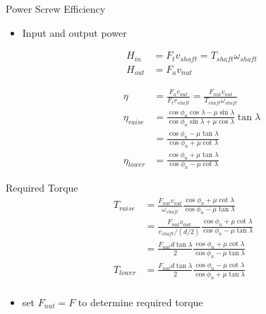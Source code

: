 \documentclass[10pt, svgnames]{beamer}
\begin{document}
\begin{frame}[label={sec:org0f19ab8}]{Power Screw Efficiency}
\begin{itemize}
\item Input and output power

\begin{align*}
  H_{in} &= F_{t} v_{shaft} = T_{shaft}\omega_{shaft} \\
  H_{out} &= F_{a} v_{nut}
\end{align*}

\begin{align*}
  \eta &= \frac{F_{a}v_{nut}}{F_{t}v_{shaft}} = \frac{F_{nut}v_{nut}}{T_{shaft}\omega_{shaft}} \\
  \eta_{raise} &= \frac{\cos \phi_{n} \cos \lambda - \mu \sin \lambda}{\cos \phi_{n} \sin \lambda + \mu \cos \lambda} \tan \lambda \\
       &= \frac{\cos \phi_{n} - \mu \tan \lambda}{\cos \phi_{n} + \mu \cot \lambda} \\
  \eta_{lower} &= \frac{\cos \phi_{n} + \mu \tan \lambda}{\cos \phi_{n} - \mu \cot \lambda}
\end{align*}
\end{itemize}
\end{frame}

\begin{frame}[label={sec:orgc786e65}]{Required Torque}
\begin{align*}
  T_{raise} &= \frac{F_{nut}v_{nut}}{\omega_{shaft}} \frac{\cos \phi_{n} + \mu \cot \lambda}{\cos \phi_{n} - \mu \tan \lambda} \\
            &= \frac{F_{nut}v_{nut}}{v_{shaft}/(d/2)} \frac{\cos \phi_{n} + \mu \cot \lambda}{\cos \phi_{n} - \mu \tan \lambda} \\
            &= \frac{F_{nut}d \tan \lambda}{2} \frac{\cos \phi_{n} + \mu \cot \lambda}{\cos \phi_{n} - \mu \tan \lambda} \\
  T_{lower} &= \frac{F_{nut}d \tan \lambda}{2} \frac{\cos \phi_{n} - \mu \cot \lambda}{\cos \phi_{n} + \mu \tan \lambda} \\
\end{align*}

\begin{itemize}
\item set \(F_{nut} = F\) to determine required torque
\end{itemize}
\end{frame}
\end{document}
